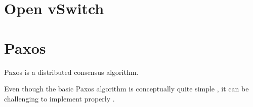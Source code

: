 \section{Open vSwitch}
\label{chapter:background.openvswitch}

\section{Paxos}
\label{chapter:background.paxos}

Paxos is a distributed consensus algorithm.

Even though the basic Paxos algorithm is conceptually quite simple
\cite{Lam01}, it can be challenging to implement properly
\cite{Chandra:2007:PML:1281100.1281103}.
